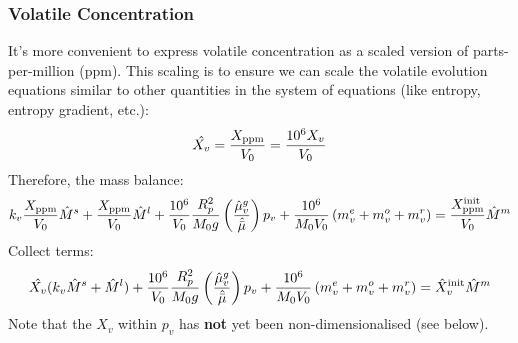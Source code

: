 \subsubsection{Volatile Concentration}
It's more convenient to express volatile concentration as a scaled version of parts-per-million (ppm).  This scaling is to ensure we can scale the volatile evolution equations similar to other quantities in the system of equations (like entropy, entropy gradient, etc.):
\begin{equation}
\hat{X_v} = \frac{X_{\rm ppm}}{V_0} = \frac{10^6 X_v}{V_0}
\end{equation}
Therefore, the mass balance:
\begin{equation}
k_v \frac{X_{\rm ppm}}{V_0} \hat{M}^s + \frac{X_{\rm ppm}}{V_0} \hat{M}^l + \frac{10^6}{V_0} \frac{R_p^2}{M_0 g} \left( \frac{\hat{\mu}_v^g}{\hat{\bar{\mu}}} \right) p_v + \frac{10^6}{M_0 V_0} \left( m_v^e + m_v^o + m_v^r \right) = \frac{X_{\rm ppm}^{\rm init}}{V_0} \hat{M}^m
\end{equation}
Collect terms:
\begin{equation}
\hat{X_v} (k_v \hat{M}^s + \hat{M}^l) + \frac{10^6}{V_0}\frac{R_p^2}{M_0 g} \left( \frac{\hat{\mu}_v^g}{\hat{\bar{\mu}}} \right) p_v + \frac{10^6}{M_0 V_0} \left( m_v^e + m_v^o + m_v^r \right) = \hat{X}_v^{\rm init} \hat{M}^m
\end{equation}
Note that the $X_v$ within $p_v$ has \textbf{not} yet been non-dimensionalised (see below).
